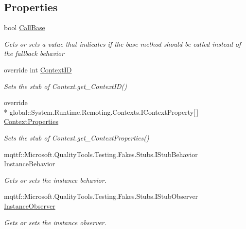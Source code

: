 \subsection*{Properties}
\begin{DoxyCompactItemize}
\item 
bool \hyperlink{class_system_1_1_runtime_1_1_remoting_1_1_contexts_1_1_fakes_1_1_stub_context_ab24f535578fd2acb010bfefa86dfd3ec}{Call\-Base}
\begin{DoxyCompactList}\small\item\em Gets or sets a value that indicates if the base method should be called instead of the fallback behavior\end{DoxyCompactList}\item 
override int \hyperlink{class_system_1_1_runtime_1_1_remoting_1_1_contexts_1_1_fakes_1_1_stub_context_a47b8f3f5557e198d9c277ef1a1e0b846}{Context\-I\-D}
\begin{DoxyCompactList}\small\item\em Sets the stub of Context.\-get\-\_\-\-Context\-I\-D()\end{DoxyCompactList}\item 
override \\*
global\-::\-System.\-Runtime.\-Remoting.\-Contexts.\-I\-Context\-Property\mbox{[}$\,$\mbox{]} \hyperlink{class_system_1_1_runtime_1_1_remoting_1_1_contexts_1_1_fakes_1_1_stub_context_a9aba568196e23e78c01f70603a5c84a2}{Context\-Properties}
\begin{DoxyCompactList}\small\item\em Sets the stub of Context.\-get\-\_\-\-Context\-Properties()\end{DoxyCompactList}\item 
mqttf\-::\-Microsoft.\-Quality\-Tools.\-Testing.\-Fakes.\-Stubs.\-I\-Stub\-Behavior \hyperlink{class_system_1_1_runtime_1_1_remoting_1_1_contexts_1_1_fakes_1_1_stub_context_a94ce3b502f8b0c59d135e178fad34b57}{Instance\-Behavior}
\begin{DoxyCompactList}\small\item\em Gets or sets the instance behavior.\end{DoxyCompactList}\item 
mqttf\-::\-Microsoft.\-Quality\-Tools.\-Testing.\-Fakes.\-Stubs.\-I\-Stub\-Observer \hyperlink{class_system_1_1_runtime_1_1_remoting_1_1_contexts_1_1_fakes_1_1_stub_context_a2851540b6360fa5c35224e9cf10e5efa}{Instance\-Observer}
\begin{DoxyCompactList}\small\item\em Gets or sets the instance observer.\end{DoxyCompactList}\end{DoxyCompactItemize}


